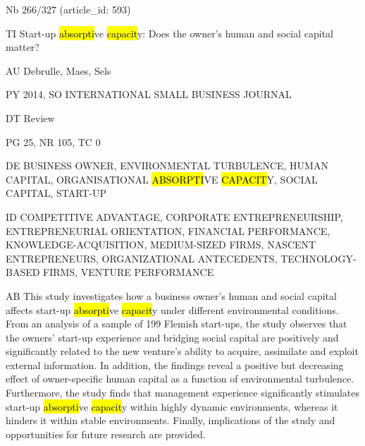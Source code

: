 \documentclass[a4paper]{article}
\begin{document}
\vspace*{-2cm}
Nb \tabto{0cm}266/327 (article\_id: 593)\par
TI \tabto{0cm}Start-up \hl{absorpti}ve \hl{capacit}y: Does the owner's human and social capital matter?\par
AU \tabto{0cm}Debrulle, Maes, Sels\par
PY \tabto{0cm}2014, SO INTERNATIONAL SMALL BUSINESS JOURNAL\par
DT \tabto{0cm}Review\par
PG \tabto{0cm}25, NR 105, TC 0\par
DE \tabto{0cm}BUSINESS OWNER, ENVIRONMENTAL TURBULENCE, HUMAN CAPITAL, ORGANISATIONAL \hl{ABSORPTI}VE \hl{CAPACIT}Y, SOCIAL CAPITAL, START-UP\par
ID \tabto{0cm}COMPETITIVE ADVANTAGE, CORPORATE ENTREPRENEURSHIP, ENTREPRENEURIAL ORIENTATION, FINANCIAL PERFORMANCE, KNOWLEDGE-ACQUISITION, MEDIUM-SIZED FIRMS, NASCENT ENTREPRENEURS, ORGANIZATIONAL ANTECEDENTS, TECHNOLOGY-BASED FIRMS, VENTURE PERFORMANCE\par
AB \tabto{0cm}This study investigates how a business owner's human and social capital affects start-up \hl{absorpti}ve \hl{capacit}y under different environmental conditions. From an analysis of a sample of 199 Flemish start-ups, the study observes that the owners' start-up experience and bridging social capital are positively and significantly related to the new venture's ability to acquire, assimilate and exploit external information. In addition, the findings reveal a positive but decreasing effect of owner-specific human capital as a function of environmental turbulence. Furthermore, the study finds that management experience significantly stimulates start-up \hl{absorpti}ve \hl{capacit}y within highly dynamic environments, whereas it hinders it within stable environments. Finally, implications of the study and opportunities for future research are provided.\par
\clearpage
\end{document}
